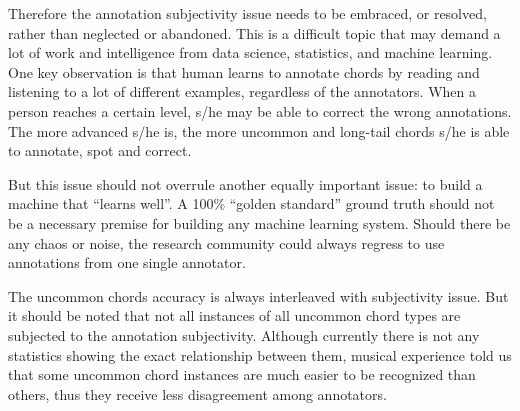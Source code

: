 Therefore the annotation subjectivity issue needs to be embraced, or resolved, rather than neglected or abandoned. This is a difficult topic that may demand a lot of work and intelligence from data science, statistics, and machine learning. One key observation is that human learns to annotate chords by reading and listening to a lot of different examples, regardless of the annotators. When a person reaches a certain level, s/he may be able to correct the wrong annotations. The more advanced s/he is, the more uncommon and long-tail chords s/he is able to annotate, spot and correct.

But this issue should not overrule another equally important issue: to build a machine that ``learns well''. A 100\% ``golden standard'' ground truth should not be a necessary premise for building any machine learning system. Should there be any chaos or noise, the research community could always regress to use annotations from one single annotator.

The uncommon chords accuracy is always interleaved with subjectivity issue. But it should be noted that not all instances of all uncommon chord types are subjected to the annotation subjectivity. Although currently there is not any statistics showing the exact relationship between them, musical experience told us that some uncommon chord instances are much easier to be recognized than others, thus they receive less disagreement among annotators.


